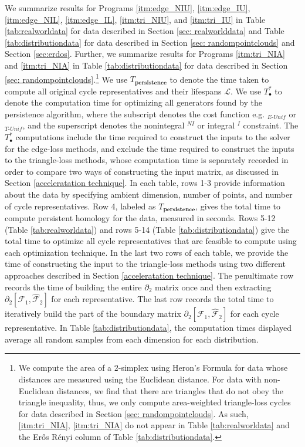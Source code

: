 \documentclass[11pt,onecolumn]{article}
\newcommand{\tab}{Table }
\newcommand{\se}{Section }
\newcommand{\NI}{^{NI}}
\newcommand{\I}{^I}
\newcommand{\persinterval}{\mathcal{L}}
\newcommand{\EU}{_{E\text{-}Unif}}
\newcommand{\TU}{_{T\text{-}Unif}}
\theoremstyle{plain}
\theoremstyle{definition}
\begin{document}
We summarize results for Programs \ref{itm:edge_NIU}, \ref{itm:edge_IU}, \ref{itm:edge_NIL},
\ref{itm:edge_IL},
\ref{itm:tri_NIU}, and 
\ref{itm:tri_IU} in \tab \ref{tab:realworldata} for data described in \se \ref{sec: realworlddata} and \tab \ref{tab:distributiondata} for data described in \se \ref{sec: randompointclouds} and \se \ref{sec:erdos}. Further, we summarize results for Programs \ref{itm:tri_NIA} and \ref{itm:tri_NIA} in \tab \ref{tab:distributiondata} for data described in \se \ref{sec: randompointclouds}.\footnote{We compute the area of a $2$-simplex using Heron's Formula for data whose distances are measured using the Euclidean distance. For data with non-Euclidean distances, we find that there are triangles that do not obey the triangle inequality, thus, we only compute area-weighted triangle-loss cycles for data described in \se \ref{sec: randompointclouds}. As such,  \ref{itm:tri_NIA}, 
\ref{itm:tri_NIA} do not appear in \tab \ref{tab:realworldata} and the Er\H{o}s R\'enyi column of \tab \ref{tab:distributiondata}.}
We use $T_\textbf{persistence}$ to denote the time taken to compute all original cycle representatives and their lifespans $\persinterval$. We use $T_\bullet^*$ to denote the computation time for optimizing all generators found by the persistence algorithm, where the subscript denotes the cost function e.g. $\EU$ or $\TU$, and the superscript denotes the nonintegral $\NI$ or integral $\I$ constraint. 
The $T_\bullet^*$ computations include the time required to construct the inputs to the solver for the edge-loss methods, and exclude the time required to construct the inputs to the triangle-loss methods, whose computation time is separately recorded in order to compare two ways of constructing the input matrix, as discussed in \se \ref{acceleratation technique}. In each table, rows 1-3 provide information about the data by specifying ambient dimension, number of points, and number of cycle representatives. Row 4, labeled as $T_\textbf{persistence}$, gives the total time to compute persistent homology for the data, measured in seconds. Rows 5-12 (\tab \ref{tab:realworldata}) and rows 5-14 (\tab \ref{tab:distributiondata}) give the total time to optimize all cycle representatives that are feasible to compute using each optimization technique. In the last two rows of each table, we provide the time of constructing the input to the triangle-loss methods using two different approaches described in \se \ref{acceleratation technique}. The penultimate row records the time of building the entire $\partial_{2}$ matrix once and then extracting $\partial_2[\mathcal{F}_1, \hat {\mathcal{F}}_{2}]$ for each representative. The last row records the total time to iteratively build the part of the boundary matrix $\partial_{2}[ \mathcal{F}_1 , \hat {\mathcal{F}}_{2} ]$ for each cycle representative. In \tab \ref{tab:distributiondata}, the computation times displayed average all random samples from each dimension for each distribution. 
\end{document}
